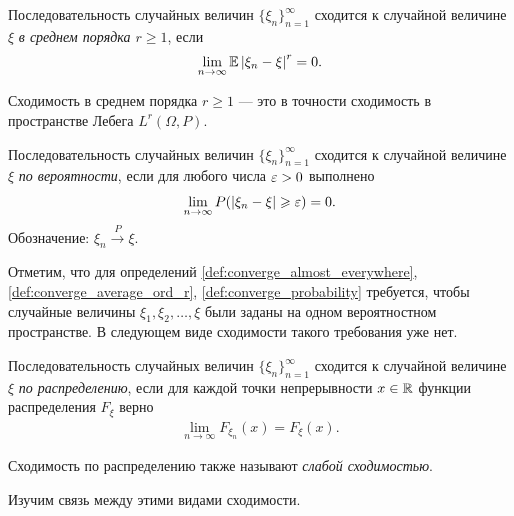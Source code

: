 \documentclass[../main.tex]{subfiles}
\begin{document}
\begin{df}
 \label{def:converge_average_ord_r}
 Последовательность случайных величин $ \{\xi_{n}\}_{n=1}^{\infty}  $ сходится к случайной величине $ \xi $   \textit{в среднем порядка $ r \geqslant 1 $}, если
 \begin{align*}
  \lim_{n \to \infty} \mathbb E \left| \xi_n-\xi \right|^{r} = 0.
 \end{align*}
\end{df}
\begin{remrk*}
 Сходимость в среднем порядка $ r \geqslant 1 $ --- это в точности сходимость в пространстве Лебега $ L^{r}(\Omega,P) $.
\end{remrk*}

\begin{df}
 \label{def:converge_probability}
 Последовательность случайных величин $ \{\xi_{n}\}_{n=1}^{\infty}  $ сходится к случайной величине $ \xi $ \textit{по вероятности}, если для любого числа $ \varepsilon > 0 $ выполнено
 \begin{align*}
  \lim_{n \to \infty} P(\left| \xi_n-\xi \right| \geqslant \varepsilon) = 0.
 \end{align*} Обозначение: $ \xi_n \xrightarrow{P} \xi $.
\end{df}

Отметим, что для определений \ref{def:converge_almost_everywhere}, \ref{def:converge_average_ord_r}, \ref{def:converge_probability} требуется, чтобы случайные величины $ \xi_1, \xi_2, \ldots, \xi $ были заданы на одном вероятностном пространстве. В следующем виде сходимости такого требования уже нет.

\begin{df}
 Последовательность случайных величин $ \{\xi_{n}\}_{n=1}^{\infty}  $ сходится к случайной величине $ \xi $  \textit{по распределению}, если для каждой точки непрерывности $ x \in \mathbb{R} $ функции распределения $ F_\xi $ верно
 \begin{align*}
  \lim_{n \to \infty} F_{\xi_n}(x) = F_\xi(x).
 \end{align*}

 Сходимость по распределению также называют \textit{слабой сходимостью}.
\end{df}

Изучим связь между этими видами сходимости.
\end{document}
